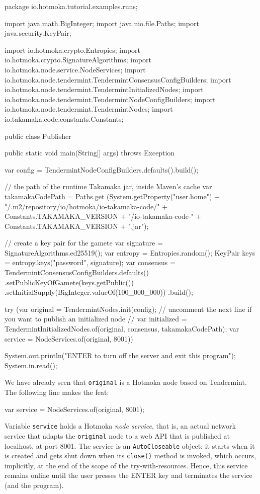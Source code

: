 \begin{codebox}\begin{javalst}
package io.hotmoka.tutorial.examples.runs;

import java.math.BigInteger;
import java.nio.file.Paths;
import java.security.KeyPair;

import io.hotmoka.crypto.Entropies;
import io.hotmoka.crypto.SignatureAlgorithms;
import io.hotmoka.node.service.NodeServices;
import io.hotmoka.node.tendermint.TendermintConsensusConfigBuilders;
import io.hotmoka.node.tendermint.TendermintInitializedNodes;
import io.hotmoka.node.tendermint.TendermintNodeConfigBuilders;
import io.hotmoka.node.tendermint.TendermintNodes;
import io.takamaka.code.constants.Constants;

public class Publisher {
  public static void main(String[] args) throws Exception {
    var config = TendermintNodeConfigBuilders.defaults().build();

    // the path of the runtime Takamaka jar, inside Maven's cache
    var takamakaCodePath = Paths.get
      (System.getProperty("user.home") +
      "/.m2/repository/io/hotmoka/io-takamaka-code/" + Constants.TAKAMAKA_VERSION +
      "/io-takamaka-code-" + Constants.TAKAMAKA_VERSION + ".jar");

    // create a key pair for the gamete
    var signature = SignatureAlgorithms.ed25519();
    var entropy = Entropies.random();
    KeyPair keys = entropy.keys("password", signature);
    var consensus = TendermintConsensusConfigBuilders.defaults()
      .setPublicKeyOfGamete(keys.getPublic())
      .setInitialSupply(BigInteger.valueOf(100_000_000))
      .build();

    try (var original = TendermintNodes.init(config);
      // uncomment the next line if you want to publish an initialized node
      // var initialized = TendermintInitializedNodes.of(original, consensus, takamakaCodePath);
      var service = NodeServices.of(original, 8001)) {

      System.out.println("\nPress ENTER to turn off the server and exit this program");
      System.in.read();
    }
  }
}
\end{javalst}\end{codebox}
%
We have already seen that \texttt{original} is a Hotmoka node based on Tendermint.
The following line makes the feat:
%
\begin{codebox}\begin{javalst}
var service = NodeServices.of(original, 8001);
\end{javalst}\end{codebox}
%
Variable \texttt{service} holds a Hotmoka \emph{node service}, that is, an actual network service that adapts
the \texttt{original} node to a web API that is published at localhost, at port 8001.
The service is an \texttt{AutoCloseable} object: it starts when it is created and gets shut down 
when its \texttt{close()} method is invoked, which occurs, implicitly, at the end of the
scope of the try-with-resources. Hence, this service remains online until the user
presses the ENTER key and terminates the service (and the program).

